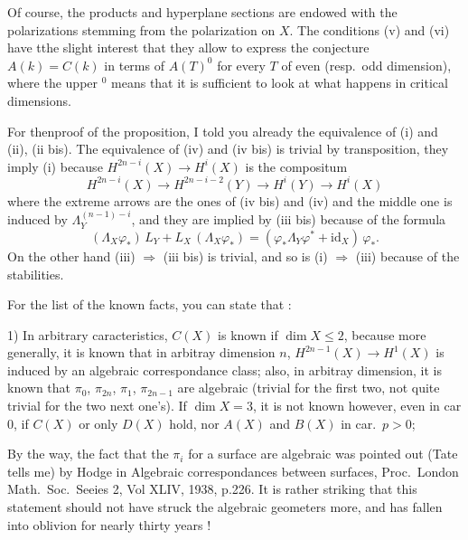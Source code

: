 \documentclass[11pt,a4paper]{article}
\begin{document}
Of course, the products and hyperplane sections are endowed with the
polarizations stemming from the polarization on $X$. The conditions (v) and (vi)
have tthe slight interest that they allow to express the conjecture
$A(k) = C(k)$ in terms of $A(T)^{0}$ for every $T$ of even (resp.\ odd
dimension), where the upper $^{0}$ means that it is sufficient to look at what
happens in critical dimensions.

For thenproof of the proposition, I told you already the equivalence of (i) and
(ii), (ii bis). The equivalence of (iv) and (iv bis) is trivial by transposition,
they  imply (i) because $H^{2n-i}(X) \to H^{i}(X)$
is the compositum
\[
  H^{2n-i}(X) \longrightarrow H^{2n-i-2}(Y) \longrightarrow H^{i}(Y)
  \longrightarrow H^{i}(X)
\]
where the extreme arrows are the ones of (iv bis) and (iv) and the middle one is
induced by $\Lambda_{Y}^{(n-1)-i}$, and they are implied by (iii bis) because of
the formula
\[
  (\Lambda_{X}\varphi_{*})\,L_{Y} + L_{X}\,(\Lambda_{X}\varphi_{*})
  = (\varphi_{*}\Lambda_{Y}\varphi^{*} + \mathrm{id}_{X})\,\varphi_{*} .
\]
On the other hand (iii) $\Longrightarrow$ (iii bis) is trivial, and so is (i)
$\Longrightarrow$ (iii) because of the stabilities.


For the list of the known facts, you can state that :

1) In arbitrary caracteristics, $C(X)$ is known if $\dim X \leq 2$, because more
generally, it is known that in arbitray dimension $n$, $H^{2n-1}(X) \to H^{1}(X)$
is induced by an algebraic correspondance class; also, in arbitray dimension, it
is known that $\pi_{0}$, $\pi_{2n}$, $\pi_{1}$, $\pi_{2n-1}$ are algebraic
(trivial for the first two, not quite trivial for the two next one's). If
$\dim X = 3$, it is not known however, even in car $0$, if $C(X)$ or only $D(X)$
hold, nor $A(X)$ and $B(X)$ in car.\ $p > 0$;



By the way, the fact that the $\pi_{i}$ for a surface are algebraic was pointed
out (Tate tells me) by Hodge in Algebraic correspondances between surfaces,
Proc.\ London Math.\ Soc.\ Seeies 2, Vol XLIV, 1938, p.226. It is rather striking
that this statement should not have struck the algebraic geometers more, and has
fallen into oblivion for nearly thirty years !
\end{document}
